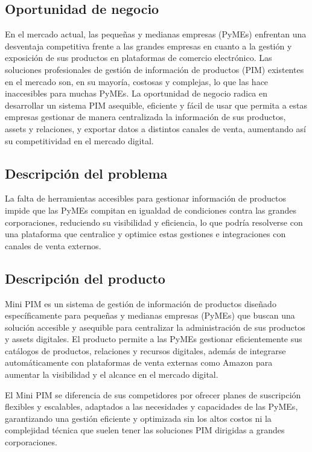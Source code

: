 \documentclass{article}
\begin{document}
\subsection{Oportunidad de negocio}

En el mercado actual, las pequeñas y medianas empresas (PyMEs) enfrentan una desventaja competitiva frente a las grandes empresas en cuanto a la gestión y exposición de sus productos en plataformas de comercio electrónico. Las soluciones profesionales de gestión de información de productos (PIM) existentes en el mercado son, en su mayoría, costosas y complejas, lo que las hace inaccesibles para muchas PyMEs. La oportunidad de negocio radica en desarrollar un sistema PIM asequible, eficiente y fácil de usar que permita a estas empresas gestionar de manera centralizada la información de sus productos, assets y relaciones, y exportar datos a distintos canales de venta, aumentando así su competitividad en el mercado digital.

\subsection{Descripción del problema}

La falta de herramientas accesibles para gestionar información de productos impide que las PyMEs compitan en igualdad de condiciones contra las grandes corporaciones, reduciendo su visibilidad y eficiencia, lo que podría resolverse con una plataforma que centralice y optimice estas gestiones e integraciones con canales de venta externos.

\subsection{Descripción del producto}

Mini PIM es un sistema de gestión de información de productos diseñado específicamente para pequeñas y medianas empresas (PyMEs) que buscan una solución accesible y asequible para centralizar la administración de sus productos y assets digitales. El producto permite a las PyMEs gestionar eficientemente sus catálogos de productos, relaciones y recursos digitales, además de integrarse automáticamente con plataformas de venta externas como Amazon para aumentar la visibilidad y el alcance en el mercado digital.

El Mini PIM se diferencia de sus competidores por ofrecer planes de suscripción flexibles y escalables, adaptados a las necesidades y capacidades de las PyMEs, garantizando una gestión eficiente y optimizada sin los altos costos ni la complejidad técnica que suelen tener las soluciones PIM dirigidas a grandes corporaciones.
\end{document}
